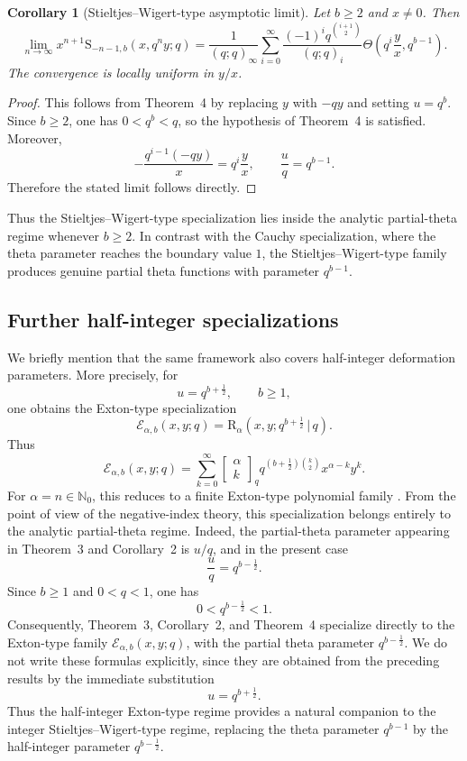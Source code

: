 \documentclass[12pt]{article}
\newcommand{\s}{\mathrm{S}}
\newcommand{\rr}{\mathrm{R}}
\newcommand{\E}{\mathcal{E}}
\newtheorem{corollary}{Corollary}
\begin{document}
\begin{corollary}[Stieltjes--Wigert-type asymptotic limit]
Let \(b\geq2\) and \(x\neq0\). Then
\[
\lim_{n\to\infty}
x^{n+1}\s_{-n-1,b}(x,q^ny;q)
=
\frac{1}{(q;q)_\infty}
\sum_{i=0}^{\infty}
\frac{(-1)^iq^{\binom{i+1}{2}}}{(q;q)_i}
\Theta\left(
q^i\frac{y}{x},
q^{b-1}
\right).
\]
The convergence is locally uniform in \(y/x\).
\end{corollary}
\begin{proof}
This follows from Theorem~4 by replacing \(y\) with \(-qy\) and setting
\(u=q^b\). Since \(b\geq2\), one has \(0<q^b<q\), so the hypothesis of
Theorem~4 is satisfied. Moreover,
\[
-\frac{q^{i-1}(-qy)}{x}
=
q^i\frac{y}{x},
\qquad
\frac{u}{q}=q^{b-1}.
\]
Therefore the stated limit follows directly.
\end{proof}

Thus the Stieltjes--Wigert-type specialization lies inside the analytic partial-theta regime whenever \(b\geq2\). In contrast with the Cauchy specialization, where the theta parameter reaches the boundary value \(1\), the Stieltjes--Wigert-type family produces genuine partial theta functions with parameter \(q^{b-1}\).


\subsection{Further half-integer specializations}

We briefly mention that the same framework also covers half-integer deformation parameters. More precisely, for 
\[ 
u=q^{b+\frac12},\qquad b\geq1, 
\] 
one obtains the Exton-type specialization 
\[ 
\E_{\alpha,b}(x,y;q) = \rr_{\alpha}\left(x,y;q^{b+\frac12}\,|\,q\right). 
\] 
Thus 
\[ 
\E_{\alpha,b}(x,y;q) = \sum_{k=0}^{\infty} \begin{bmatrix} \alpha\\ k \end{bmatrix}_{q} q^{\left(b+\frac12\right)\binom{k}{2}} x^{\alpha-k}y^k. 
\] 
For \(\alpha=n\in\mathbb N_0\), this reduces to a finite Exton-type polynomial family \cite{orozco}. From the point of view of the negative-index theory, this specialization belongs entirely to the analytic partial-theta regime. Indeed, the partial-theta parameter appearing in Theorem~3 and Corollary~2 is \(u/q\), and in the present case 
\[ 
\frac{u}{q}=q^{b-\frac12}. 
\] 
Since \(b\geq1\) and \(0<q<1\), one has 
\[ 
0<q^{b-\frac12}<1. 
\] 
Consequently, Theorem~3, Corollary~2, and Theorem~4 specialize directly to the Exton-type family \(\E_{\alpha,b}(x,y;q)\), with the partial theta parameter \(q^{b-\frac12}\). We do not write these formulas explicitly, since they are obtained from the preceding results by the immediate substitution \[ 
u=q^{b+\frac12}. 
\] 
Thus the half-integer Exton-type regime provides a natural companion to the integer Stieltjes--Wigert-type regime, replacing the theta parameter \(q^{b-1}\) by the half-integer parameter \(q^{b-\frac12}\).
\end{document}
